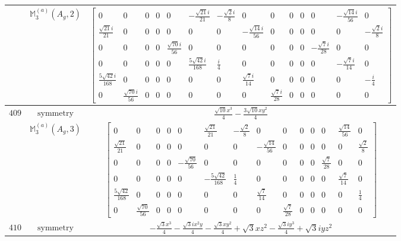\documentclass[fleqn,8pt,landscape]{jsarticle}
\begin{document}
\begin{longtable}{ccc}
$  $ & $ \mathbb{M}_{3}^{(a)}(A_{g},2) $ & $ \begin{bmatrix} 0 & 0 & 0 & 0 & 0 & - \frac{\sqrt{21} i}{21} & - \frac{\sqrt{2} i}{8} & 0 & 0 & 0 & 0 & 0 & - \frac{\sqrt{14} i}{56} & 0 \\ \frac{\sqrt{21} i}{21} & 0 & 0 & 0 & 0 & 0 & 0 & - \frac{\sqrt{14} i}{56} & 0 & 0 & 0 & 0 & 0 & - \frac{\sqrt{2} i}{8} \\ 0 & 0 & 0 & 0 & \frac{\sqrt{70} i}{56} & 0 & 0 & 0 & 0 & 0 & 0 & - \frac{\sqrt{7} i}{28} & 0 & 0 \\ 0 & 0 & 0 & 0 & 0 & \frac{5 \sqrt{42} i}{168} & \frac{i}{4} & 0 & 0 & 0 & 0 & 0 & - \frac{\sqrt{7} i}{14} & 0 \\ \frac{5 \sqrt{42} i}{168} & 0 & 0 & 0 & 0 & 0 & 0 & \frac{\sqrt{7} i}{14} & 0 & 0 & 0 & 0 & 0 & - \frac{i}{4} \\ 0 & \frac{\sqrt{70} i}{56} & 0 & 0 & 0 & 0 & 0 & 0 & \frac{\sqrt{7} i}{28} & 0 & 0 & 0 & 0 & 0 \end{bmatrix} $ \\ \hline
$ 409 $ & $ \text{symmetry} $ & $ \frac{\sqrt{10} x^{3}}{4} - \frac{3 \sqrt{10} x y^{2}}{4} $ \\
$  $ & $ \mathbb{M}_{3}^{(a)}(A_{g},3) $ & $ \begin{bmatrix} 0 & 0 & 0 & 0 & 0 & \frac{\sqrt{21}}{21} & - \frac{\sqrt{2}}{8} & 0 & 0 & 0 & 0 & 0 & \frac{\sqrt{14}}{56} & 0 \\ \frac{\sqrt{21}}{21} & 0 & 0 & 0 & 0 & 0 & 0 & - \frac{\sqrt{14}}{56} & 0 & 0 & 0 & 0 & 0 & \frac{\sqrt{2}}{8} \\ 0 & 0 & 0 & 0 & - \frac{\sqrt{70}}{56} & 0 & 0 & 0 & 0 & 0 & 0 & \frac{\sqrt{7}}{28} & 0 & 0 \\ 0 & 0 & 0 & 0 & 0 & - \frac{5 \sqrt{42}}{168} & \frac{1}{4} & 0 & 0 & 0 & 0 & 0 & \frac{\sqrt{7}}{14} & 0 \\ \frac{5 \sqrt{42}}{168} & 0 & 0 & 0 & 0 & 0 & 0 & \frac{\sqrt{7}}{14} & 0 & 0 & 0 & 0 & 0 & \frac{1}{4} \\ 0 & \frac{\sqrt{70}}{56} & 0 & 0 & 0 & 0 & 0 & 0 & \frac{\sqrt{7}}{28} & 0 & 0 & 0 & 0 & 0 \end{bmatrix} $ \\ \hline
$ 410 $ & $ \text{symmetry} $ & $ - \frac{\sqrt{3} x^{3}}{4} - \frac{\sqrt{3} i x^{2} y}{4} - \frac{\sqrt{3} x y^{2}}{4} + \sqrt{3} x z^{2} - \frac{\sqrt{3} i y^{3}}{4} + \sqrt{3} i y z^{2} $ \\

\end{longtable}
\end{document}
